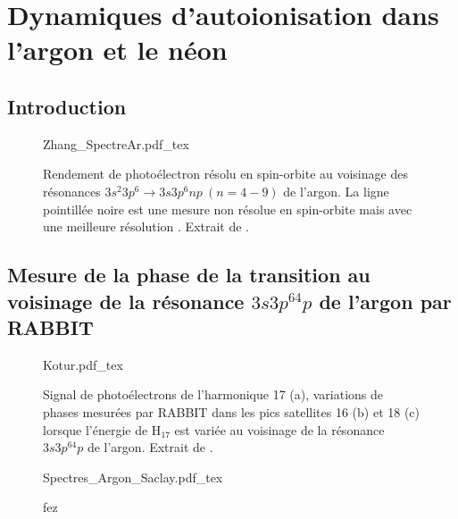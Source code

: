 \part{Dynamiques d'autoionisation dans l'argon et le néon}
\label{part:Argon}
\chapter*{Introduction}

\begin{figure}
\centering
\def\svgwidth{0.85\textwidth}
{Zhang_SpectreAr.pdf_tex}
\caption{Rendement de photoélectron résolu en spin-orbite au voisinage des résonances $3s^2 3p^6 \rightarrow 3s 3p^6 np \: (n = 4 - 9) $ de l'argon. La ligne pointillée noire est une mesure non résolue en spin-orbite mais avec une meilleure résolution . Extrait de .}
\label{fig:Zhang_SpectreAr}
\end{figure}

\chapter[Mesure de la phase de la transition au voisinage de la résonance $3s3p^64p$ de l'argon par RABBIT]{Mesure de la phase de la transition au voisinage de la résonance \MakeLowercase{$3s3p^64p$} de l'argon par RABBIT}

\begin{figure}
\centering
\def\svgwidth{0.5\textwidth}
{Kotur.pdf_tex}
\caption{Signal de photoélectrons de l'harmonique 17 (a), variations de phases mesurées par RABBIT dans les pics satellites 16 (b) et 18 (c) lorsque l'énergie de H$_{17}$ est variée au voisinage de la résonance $3s3p^64p$ de l'argon. Extrait de .}
\label{fig:Kotur}
\end{figure}

\begin{figure}
\centering
\def\svgwidth{1\textwidth}
{Spectres_Argon_Saclay.pdf_tex}
\caption{fez}
\label{fig:Spectres_Argon_Saclay}
\end{figure}


